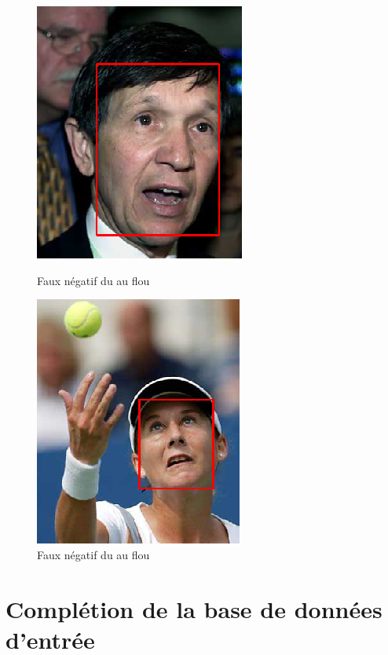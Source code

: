 \documentclass[a4paper,11pt]{article}
\begin{document}
	    \begin{figure}[H]
	        \centering
	        \begin{minipage}[c]{0.50\linewidth}
	            \begin{center}
	                \includegraphics[scale=0.45]{facenetFN3.png}
	                \caption{Faux négatif du au flou}
	            \end{center}
	        \end{minipage} \hfill
	        \begin{minipage}[c]{0.45\linewidth}
	            \begin{center}
	                \includegraphics[scale=0.52]{facenetFN4.png}
	                \caption{Faux négatif du au flou}
	            \end{center}
	        \end{minipage}
	    \end{figure}

\section{Complétion de la base de données d'entrée}
\label{sec:completion}
    
\end{document}
